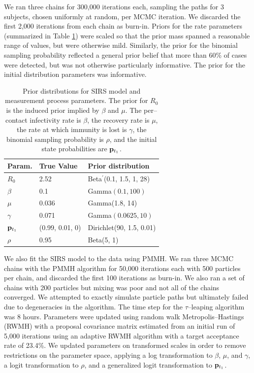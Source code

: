 We ran three chains for 300,000 iterations each, sampling the paths for 3 subjects, chosen uniformly at random, per MCMC iteration. We discarded the first 2,000 iterations from each chain as burn-in. Priors for the rate parameters (summarized in Table \ref{tab:sim1_sirs_priors}) were scaled so that the prior mass spanned a reasonable range of values, but were otherwise mild. Similarly, the prior for the binomial sampling probability reflected a general prior belief that more than 60\% of cases were detected, but was not otherwise particularly informative. The prior for the initial distribution parameters was informative.

\begin{table}[htbp]
	\centering
	\begin{tabular}{lll}
		\hline
		Param. & True Value & Prior distribution \\ 
		\hline
		$ R_0 $ & 2.52 & Beta$ ^\prime $(0.1, 1.5, 1, 28) \\
		$ \beta $ & 0.1 & Gamma$ (0.1, 100) $ \\
		$ \mu $ & 0.036 & Gamma(1.8, 14)  \\ 
		$ \gamma $ & 0.071 & Gamma$ (0.0625, 10) $\\ 
		$ \mathbf{p}_{t_1} $ & (0.99, 0.01, 0) & Dirichlet(90, 1.5, 0.01)  \\ 
		$ \rho $ & 0.95 & Beta(5, 1) \\
		\hline
	\end{tabular}
	\caption[Simulation 1 SIRS model priors.]{Prior distributions for SIRS model and measurement process parameters. The prior for $ R_0 $ is the induced prior implied by $ \beta $ and $ \mu $. The per--contact infectivity rate is $ \beta $, the recovery rate is $ \mu $, the rate at which immunity is lost is $ \gamma $, the binomial sampling probability is $ \rho $, and the initial state probabilities are $ \mathbf{p}_{t_1} $.}
	\label{tab:sim1_sirs_priors}
\end{table}

We also fit the SIRS model to the data using PMMH. We ran three MCMC chains with the PMMH algorithm for 50,000 iterations each with 500 particles per chain, and discarded the first 100 iterations as burn-in. We also ran a set of chains with 200 particles but mixing was poor and not all of the chains converged. We attempted to exactly simulate particle paths but ultimately failed due to degeneracies in the algorithm. The time step for the $ \tau $--leaping algorithm was 8 hours. Parameters were updated using random walk Metropolis--Hastings (RWMH) with a proposal covariance matrix estimated from an initial run of 5,000 iterations using an adaptive RWMH algorithm with a target acceptance rate of 23.4\%. We updated parameters on transformed scales in order to remove restrictions on the parameter space, applying a log transformation to $ \beta $, $ \mu $, and $ \gamma $, a logit transformation to $ \rho $, and a generalized logit transformation to $ \mathbf{p}_{t_1} $.

